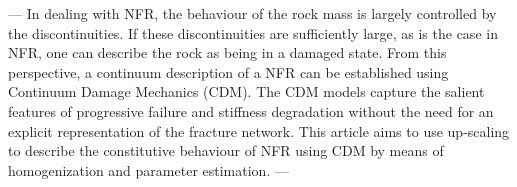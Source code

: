 --- 
In dealing with NFR, the behaviour of the rock mass is largely controlled by the discontinuities. If these discontinuities are sufficiently large, as is the case in NFR, one can describe the rock as being in a damaged state. From this perspective, a continuum description of a NFR can be established using Continuum Damage Mechanics (CDM). The CDM models capture the salient features of progressive failure and stiffness degradation without the need for an explicit representation of the fracture network. This article aims to use up-scaling to describe the constitutive behaviour of NFR using CDM by means of homogenization and parameter estimation. 
---
